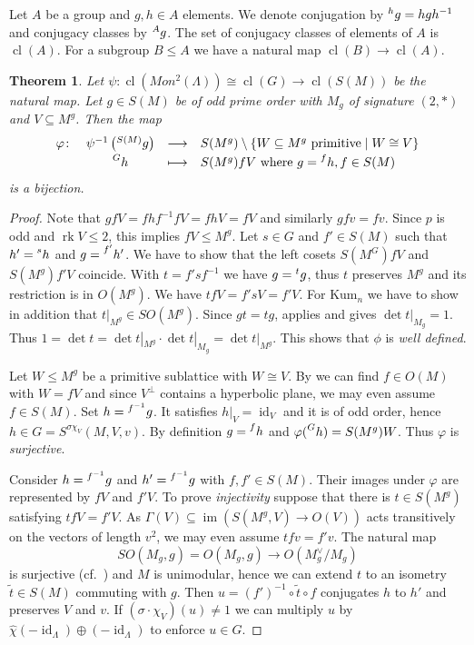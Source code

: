 \documentclass{amsart}
\theoremstyle{definition}
\theoremstyle{plain}
\newtheorem{theorem}[definition]{Theorem}
\DeclareMathOperator{\cl}{cl}
\DeclareMathOperator{\rk}{rk}
\DeclareMathOperator{\id}{id}
\DeclareMathOperator{\im}{im}
\newcommand{\disc}[1]{#1^{\vee} \! / #1 }
\newcommand{\kumn}{\mathrm{Kum}_n}
\begin{document}
Let $A$ be a group and $g,h \in A$ elements. We denote conjugation by $\prescript{h}{}{g}=hgh^{-1}$ and conjugacy classes by $\prescript{A}{}{g}$.
The set of conjugacy classes of elements of $A$ is $\cl(A)$. For a subgroup $B \leq A$ we have a natural map
$\cl(B) \rightarrow \cl(A)$.
\begin{theorem}\label{thm:fiber}
Let
 $\psi \colon \cl(Mon^2(\Lambda))\cong \cl(G) \rightarrow \cl(S(M))$
 be the natural map.
Let $g \in S(M)$ be of odd prime order with $M_g$ of signature $(2,\ast)$ and $V \subseteq M^g$. Then the map
\[
\begin{array}{rccl}
\varphi \colon &\psi^{-1}\left(\prescript{S(M)}{}{g}\right) &\longrightarrow &S(M^g) \setminus \left\{W \subseteq M^g \text{ primitive} \mid W \cong V \right\}\\[2pt]
 &\prescript{G}{}{h} &\longmapsto&S(M^g)fV \mbox{ where } g=\prescript{f}{}{h}, f\in S(M)
\end{array}
\]
is a bijection.
\end{theorem}
\begin{proof}
 Note that $gfV=fhf^{-1}fV=fhV = fV$ and similarly $gfv=fv$. Since $p$ is odd and $\rk V \leq 2$, this implies $fV \leq M^g$. Let $s \in G$ and $f' \in S(M)$ such that
 $h' = \prescript{s}{}{h}$ and $g=\prescript{f'}{}{h'}$.
 We have to show that the left cosets $S(M^G)fV$ and $S(M^g)f'V$ coincide.
 With $t = f'sf^{-1}$ we have $g=\prescript{t}{}{g}$, thus $t$ preserves $M^g$ and its restriction is in
 $O(M^g)$. We have $tfV=f'sV=f'V$.
 For $\kumn$ we have to show in addition that $t|_{M^g} \in SO(M^g)$. Since $gt=tg$,  applies and gives $\det t|_{M_g}=1$. Thus $1 = \det t = \det t|_{M^g} \cdot \det t|_{M_g}= \det t|_{M^g}$.
 This shows that $\phi$ is \emph{well defined}.
 
Let $W \leq M^g$ be a primitive sublattice with $W \cong V$. By  \cite[Prop.\ 1.6.1]{nikulin} we can find $f \in O(M)$ with $W=fV$ and
since $V^\perp$ contains a hyperbolic plane, we may even assume $f \in S(M)$.
Set $h=\prescript{f^{-1}}{}{g}$. It satisfies $h|_V=\id_V$ and it is of odd order, hence $h \in G=S^{\sigma \chi_V}(M,V,v)$. By definition $g = \prescript{f}{}{h}$ and $\varphi(\prescript{G}{}{h})=S(M^g)W$. Thus $\varphi$ is \emph{surjective}.

Consider $h=\prescript{f^{-1}}{}{g}$ and $h'=\prescript{f^{-1}}{}{g}$ with
$f,f' \in S(M)$.  Their images under $\varphi$ are represented by $fV$ and $f'V$. To prove \emph{injectivity}
suppose that there is $t \in S(M^g)$ satisfying $tfV=f'V$.
As $\Gamma(V)\subseteq \im(S(M^g,V)\rightarrow O(V))$ acts transitively on the vectors of length $v^2$, we may even assume $tfv=f'v$. The natural map
 \[SO(M_g,g)=O(M_g,g) \rightarrow O(\disc{M_g})\]
 is surjective (cf.\ ) and $M$ is unimodular, hence we can extend $t$ to an isometry $\widetilde{t} \in S(M)$ commuting with $g$. Then
 $u=(f')^{-1} \circ \widetilde{t} \circ f$ conjugates $h$ to $h'$ and preserves $V$ and $v$.
 If $(\sigma\cdot \chi_V) (u) \neq 1$ we can multiply $u$ by
 $\hat\chi(-\id_\Lambda)\oplus (-\id_\Lambda)$ to enforce $u \in G$.
\end{proof}
\end{document}
